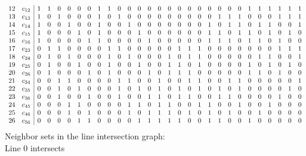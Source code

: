 \documentclass{article}
\begin{document}
{{$$\begin{array}{rr|*{27}r}
12 & c_{12} & 1 & 1 & 0 & 0 & 0 & 0 & 1 & 1 & 0 & 0 & 0 & 0 & 0 & 0 & 0 & 0 & 0 & 0 & 0 & 0 & 0 & 1 & 1 & 1 & 1 & 1 & 1\\
13 & c_{13} & 1 & 0 & 1 & 0 & 0 & 0 & 1 & 0 & 1 & 0 & 0 & 0 & 0 & 0 & 0 & 0 & 0 & 0 & 1 & 1 & 1 & 0 & 0 & 0 & 1 & 1 & 1\\
14 & c_{14} & 1 & 0 & 0 & 1 & 0 & 0 & 1 & 0 & 0 & 1 & 0 & 0 & 0 & 0 & 0 & 0 & 0 & 1 & 0 & 1 & 1 & 0 & 1 & 1 & 0 & 0 & 1\\
15 & c_{15} & 1 & 0 & 0 & 0 & 1 & 0 & 1 & 0 & 0 & 0 & 1 & 0 & 0 & 0 & 0 & 0 & 0 & 1 & 1 & 0 & 1 & 1 & 0 & 1 & 0 & 1 & 0\\
16 & c_{16} & 1 & 0 & 0 & 0 & 0 & 1 & 1 & 0 & 0 & 0 & 0 & 1 & 0 & 0 & 0 & 0 & 0 & 1 & 1 & 1 & 0 & 1 & 1 & 0 & 1 & 0 & 0\\
17 & c_{23} & 0 & 1 & 1 & 0 & 0 & 0 & 0 & 1 & 1 & 0 & 0 & 0 & 0 & 0 & 1 & 1 & 1 & 0 & 0 & 0 & 0 & 0 & 0 & 0 & 1 & 1 & 1\\
18 & c_{24} & 0 & 1 & 0 & 1 & 0 & 0 & 0 & 1 & 0 & 1 & 0 & 0 & 0 & 1 & 0 & 1 & 1 & 0 & 0 & 0 & 0 & 0 & 1 & 1 & 0 & 0 & 1\\
19 & c_{25} & 0 & 1 & 0 & 0 & 1 & 0 & 0 & 1 & 0 & 0 & 1 & 0 & 0 & 1 & 1 & 0 & 1 & 0 & 0 & 0 & 0 & 1 & 0 & 1 & 0 & 1 & 0\\
20 & c_{26} & 0 & 1 & 0 & 0 & 0 & 1 & 0 & 1 & 0 & 0 & 0 & 1 & 0 & 1 & 1 & 1 & 0 & 0 & 0 & 0 & 0 & 1 & 1 & 0 & 1 & 0 & 0\\
21 & c_{34} & 0 & 0 & 1 & 1 & 0 & 0 & 0 & 0 & 1 & 1 & 0 & 0 & 1 & 0 & 0 & 1 & 1 & 0 & 0 & 1 & 1 & 0 & 0 & 0 & 0 & 0 & 1\\
22 & c_{35} & 0 & 0 & 1 & 0 & 1 & 0 & 0 & 0 & 1 & 0 & 1 & 0 & 1 & 0 & 1 & 0 & 1 & 0 & 1 & 0 & 1 & 0 & 0 & 0 & 0 & 1 & 0\\
23 & c_{36} & 0 & 0 & 1 & 0 & 0 & 1 & 0 & 0 & 1 & 0 & 0 & 1 & 1 & 0 & 1 & 1 & 0 & 0 & 1 & 1 & 0 & 0 & 0 & 0 & 1 & 0 & 0\\
24 & c_{45} & 0 & 0 & 0 & 1 & 1 & 0 & 0 & 0 & 0 & 1 & 1 & 0 & 1 & 1 & 0 & 0 & 1 & 1 & 0 & 0 & 1 & 0 & 0 & 1 & 0 & 0 & 0\\
25 & c_{46} & 0 & 0 & 0 & 1 & 0 & 1 & 0 & 0 & 0 & 1 & 0 & 1 & 1 & 1 & 0 & 1 & 0 & 1 & 0 & 1 & 0 & 0 & 1 & 0 & 0 & 0 & 0\\
26 & c_{56} & 0 & 0 & 0 & 0 & 1 & 1 & 0 & 0 & 0 & 0 & 1 & 1 & 1 & 1 & 1 & 0 & 0 & 1 & 1 & 0 & 0 & 1 & 0 & 0 & 0 & 0 & 0\\
\end{array}
$$
}%
Neighbor sets in the line intersection graph:\\
Line 0 intersects 
$$
\begin{array}{|r*{10}{|c}|}

\end{array}$$}
\end{document}
